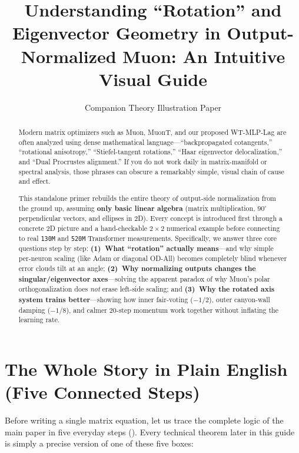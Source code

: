 \documentclass[11pt]{article}
\title{Understanding ``Rotation'' and Eigenvector Geometry in Output-Normalized Muon: An Intuitive Visual Guide}
\author{Companion Theory Illustration Paper}
\newcommand{\mname}[1]{#1}
\begin{document}
\maketitle

\begin{abstract}
Modern matrix optimizers such as \mname{Muon}, \mname{MuonT}, and our proposed \mname{WT-MLP-Lag} are often analyzed using dense mathematical language---``backpropagated cotangents,'' ``rotational anisotropy,'' ``Stiefel-tangent rotations,'' ``Haar eigenvector delocalization,'' and ``Dual Procrustes alignment.''
If you do not work daily in matrix-manifold or spectral analysis, those phrases can obscure a remarkably simple, visual chain of cause and effect.

This standalone primer rebuilds the entire theory of output-side normalization from the ground up, assuming \textbf{only basic linear algebra} (matrix multiplication, $90^\circ$ perpendicular vectors, and ellipses in 2D).
Every concept is introduced first through a concrete 2D picture and a hand-checkable $2\times 2$ numerical example before connecting to real \texttt{130M} and \texttt{520M} Transformer measurements.
Specifically, we answer three core questions step by step:
\textbf{(1)~What ``rotation'' actually means}---and why simple per-neuron scaling (like Adam or diagonal \mname{OD-All}) becomes completely blind whenever error clouds tilt at an angle;
\textbf{(2)~Why normalizing outputs changes the singular/eigenvector axes}---solving the apparent paradox of why \mname{Muon}'s polar orthogonalization does \emph{not} erase left-side scaling; and
\textbf{(3)~Why the rotated axis system trains better}---showing how inner fair-voting ($-1/2$), outer canyon-wall damping ($-1/8$), and calmer 20-step momentum work together without inflating the learning rate.
\end{abstract}

\section{The Whole Story in Plain English (Five Connected Steps)}
\label{sec:big_picture}

Before writing a single matrix equation, let us trace the complete logic of the main paper in five everyday steps (). Every technical theorem later in this guide is simply a precise version of one of these five boxes:
\end{document}
